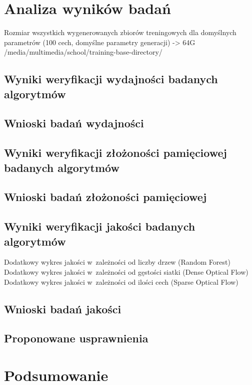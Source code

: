 \chapter{Analiza wyników badań}\label{Chapter_AnalizaRezultatow}

  Rozmiar wszystkich wygenerowanych zbiorów treningowych dla domyślnych parametrów (100 cech, domyślne parametry generacji) -> 64G /media/multimedia/school/training-base-directory/

  \section{Wyniki weryfikacji wydajności badanych algorytmów}\label{Section_Performance}

  \section{Wnioski badań wydajności}\label{Section_PerformanceWnioski}

  \section{Wyniki weryfikacji złożoności pamięciowej badanych algorytmów}\label{Section_MemoryPerformance}

  \section{Wnioski badań złożoności pamięciowej}\label{Section_MemoryPerformanceWnioski}

  \section{Wyniki weryfikacji jakości badanych algorytmów}\label{Section_Quality}

  Dodatkowy wykres jakości w~zależności od liczby drzew (Random Forest)
  Dodatkowy wykres jakości w~zależności od gęstości siatki (Dense Optical Flow)
  Dodatkowy wykres jakości w~zależności od ilości cech (Sparse Optical Flow)

  \section{Wnioski badań jakości}\label{Section_QualityWnioski}

  \section{Proponowane usprawnienia}\label{Section_Usprawnienia}

\chapter{Podsumowanie}\label{Section_Podsumowanie}